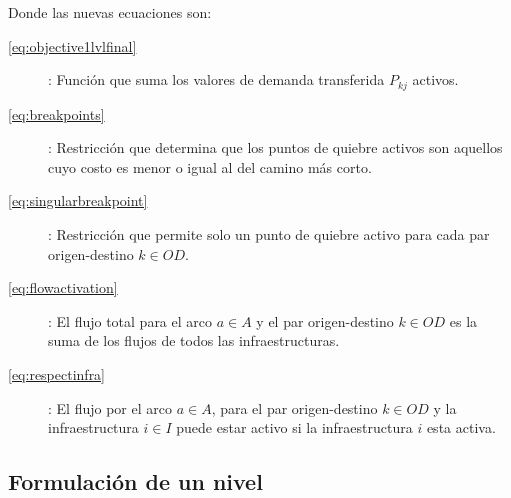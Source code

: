 \documentclass{article}
\begin{document}
  Donde las nuevas ecuaciones son:

  \begin{description}
    \item[\ref{eq:objective1lvlfinal}]: Función que suma los valores de demanda transferida $P_{kj}$ activos.
    \item[\ref{eq:breakpoints}]: Restricción que determina que los puntos de quiebre activos son aquellos cuyo costo es menor o igual al del camino más corto.
    \item[\ref{eq:singularbreakpoint}]: Restricción que permite solo un punto de quiebre activo para cada par origen-destino $k \in OD$.
    \item[\ref{eq:flowactivation}]: El flujo total para el arco $a \in A$ y el par origen-destino $k \in OD$ es la suma de los flujos de todos las infraestructuras.
    \item[\ref{eq:respectinfra}]: El flujo por el arco $a \in A$, para el par origen-destino $k \in OD$ y la infraestructura $i \in I$ puede estar activo si la infraestructura $i$ esta activa.  
  \end{description}

  \subsection*{Formulación de un nivel}
\end{document}
